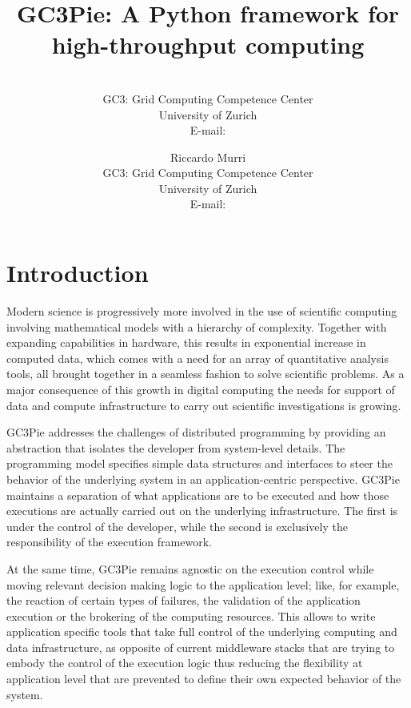 \documentclass{PoS}
\title{GC3Pie: A Python framework for high-throughput computing}
\author{\speaker{Sergio MAFFIOLETTI}\\
        GC3: Grid Computing Competence Center\\
        University of Zurich \\
         E-mail: \email{sergio.maffioletti@gc3.uzh.ch}}
\author{Riccardo Murri\\
        GC3: Grid Computing Competence Center\\
        University of Zurich \\
        E-mail: \email{riccardo.murri@gmail.com}}
\begin{document}
\section{Introduction}

Modern science is progressively more involved in the use of scientific
computing involving mathematical models with a hierarchy of
complexity. Together with expanding capabilities in hardware, this
results in exponential increase in computed data, which comes with a
need for an array of quantitative analysis tools,
all brought together in a seamless fashion to solve scientific
problems. As a major consequence of this growth in digital computing
the needs for support of data and compute infrastructure to carry out
scientific investigations is growing.  

GC3Pie addresses the challenges of distributed programming by
providing an abstraction that isolates the developer from system-level
details. The programming model specifies simple data structures and
interfaces to steer the behavior of the underlying system in an
application-centric perspective.
GC3Pie maintains a separation of what applications are to be executed
and how those executions are actually carried out on the underlying
infrastructure. The first is under the control of the developer, while
the second is exclusively the responsibility of the execution
framework. 

At the same time, GC3Pie remains agnostic on the execution control
while moving relevant decision making logic to the application
level; like, for example, the reaction of certain types of failures,
the validation of the application execution or the brokering of the
computing resources.
This allows to write application specific tools that take full
control of the underlying computing and data infrastructure, as
opposite of current middleware stacks that are trying to embody the
control of the execution logic thus reducing the flexibility at
application level that are prevented to define their own
expected behavior of the system.
\end{document}
